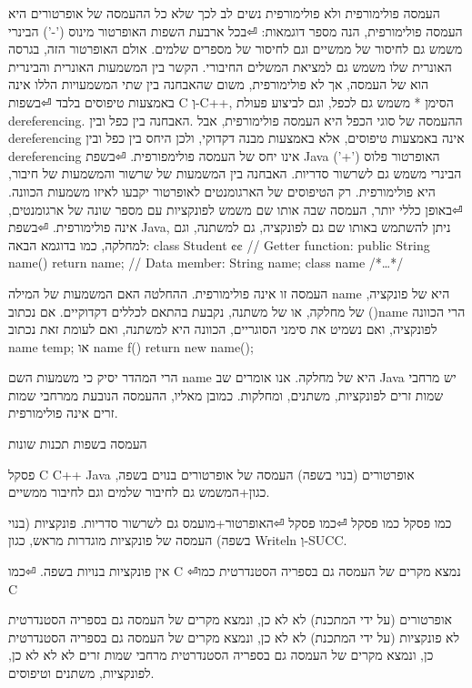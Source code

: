 \begin{טבלא}[!htbp]
      העמסה פולימורפית ולא פולימורפית
      נשים לב לכך שלא כל ההעמסה של אופרטורים היא העמסה פולימורפית, הנה מספר דוגמאות:
⏎בכל ארבעת השפות האופרטור מינוס ('-') הבינרי משמש גם לחיסור של ממשיים וגם לחיסור של מספרים שלמים. אולם האופרטור הזה, בגרסה האונרית שלו משמש גם למציאת המשלים החיבורי. הקשר בין המשמעות האונרית והבינרית הוא של העמסה, אך לא פולימורפית, משום שהאבחנה בין שתי המשמעויות הללו אינה באמצעות טיפוסים בלבד
⏎בשפות C וְ-C++, הסימן * משמש גם לכפל, וגם לביצוע פעולת dereferencing. ההעמסה של סוגי הכפל היא העמסה פולימורפית, אבל .האבחנה בין כפל ובין dereferencing אינה באמצעות טיפוסים, אלא באמצעות מבנה דקדוקי, ולכן היחס בין כפל ובין dereferencing אינו יחס של העמסה פולימפורפית.
⏎בשפת Java האופרטור פלוס ('+') הבינרי משמש גם לשרשור סדריות. האבחנה בין המשמעות של שרשור והמשמעות של חיבור, היא פולימורפית. רק הטיפוסים של הארגומנטים לאופרטור יקבעו לאיזו משמעות הכוונה.
⏎באופן כללי יותר, העמסה שבה אותו שם משמש לפונקציות עם מספר שונה של ארגומנטים, אינה פולימורפית.
⏎בשפת Java, ניתן להשתמש באותו שם גם לפונקציה, גם למשתנה, וגם למחלקה, כמו בדוגמא הבאה:
      class Student {¢¢
        // Getter function:
        public String name() { return name; }
        // Data member:
        String name;
        class name { /*…*/ }
      }

      העמסה זו אינה פולימורפית. ההחלטה האם המשמעות של המילה name היא של פונקציה, של מחלקה, או של משתנה, נקבעת בהתאם לכללים דקדוקיים. אם נכתוב ()name הרי הכוונה לפונקציה, ואם נשמיט את סימני הסוגריים, הכוונה היא למשתנה, ואם לעומת זאת נכתוב
      name temp;
      או
      name f() { return new name(); }

      הרי המהדר יסיק כי משמעות השם name היא של מחלקה. אנו אומרים שב Java יש מרחבי שמות זרים לפונקציות, משתנים, ומחלקות. כמובן מאליו, ההעמסה הנובעת ממרחבי שמות זרים אינה פולימורפית.

      העמסה בשפות תכנות שונות

      פסקל
      C
      C++
      Java
      אופרטורים
      (בנוי בשפה)
      העמסה של אופרטורים בנוים בשפה, כגון+המשמש גם לחיבור שלמים וגם לחיבור ממשיים.

      כמו פסקל
      כמו פסקל
⏎כמו פסקל
⏎האופרטור+מועמס גם לשרשור סדריות.
      פונקציות (בנוי בשפה)
      העמסה של פונקציות מוגדרות מראש, כגון Writeln וְ-SUCC.

      אין פונקציות בנויות בשפה.
⏎כמו C
⏎נמצא מקרים של העמסה גם בספריה הסטנדרטית
      כמו C

      אופרטורים
      (על ידי המתכנת)
      לא
      לא
      כן, ונמצא מקרים של העמסה גם בספריה הסטנדרטית
      לא
      פונקציות
      (על ידי המתכנת)
      לא
      לא
      כן, ונמצא מקרים של העמסה גם בספריה הסטנדרטית
      כן, ונמצא מקרים של העמסה גם בספריה הסטנדרטית
      מרחבי שמות זרים
      לא
      לא
      לא
      כן, לפונקציות, משתנים וטיפוסים.


\end{טבלא}
